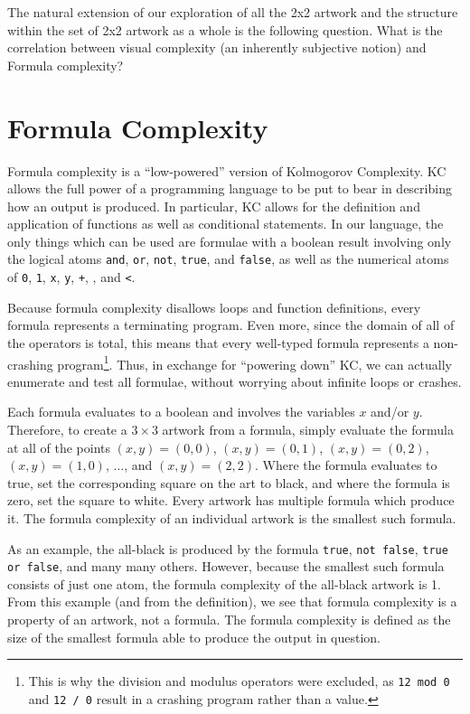 

The natural extension of our exploration of all the 2x2 artwork and the structure within the set of 2x2 artwork as a whole is the following question. What is the correlation between visual complexity (an inherently subjective notion) and
Formula complexity?  

\section{Formula Complexity}
Formula complexity is a ``low-powered'' version of Kolmogorov Complexity.  KC
allows the full power of a programming language to be put to bear in describing
how an output is produced.  In particular, KC allows for the definition and
application of functions as well as conditional statements.  In our language,
the only things which can be used are formulae with a boolean result
involving only the logical atoms {\tt and}, {\tt or}, {\tt not}, {\tt true},
and {\tt false}, as well as the numerical atoms of {\tt 0}, {\tt 1}, {\tt x},
{\tt y}, {\tt +}, {\tt *}, and {\tt <}.

Because formula complexity disallows loops and function definitions, every
formula represents a terminating program.  Even more, since the domain of all
of the operators is total, this means that every well-typed formula represents
a non-crashing program\footnote{This is why the division and modulus operators
were excluded, as {\tt 12 mod 0} and {\tt 12 / 0} result in a crashing program
rather than a value.}.  Thus, in exchange for ``powering down'' KC, we can
actually enumerate and test all formulae, without worrying about infinite loops
or crashes.

Each formula evaluates to a boolean and involves the variables $x$ and/or $y$.
Therefore, to create a $3\times3$ artwork from a formula, simply evaluate the formula
at all of the points $(x,y) = (0,0)$, $(x,y) = (0,1)$, $(x,y) = (0,2)$, $(x,y)
= (1,0)$, $\ldots$, and $(x,y) = (2,2)$.  Where the formula evaluates to true,
set the corresponding square on the art to black, and where the formula is
zero, set the square to white.  Every artwork has multiple formula which
produce it.  The formula complexity of an individual artwork is the smallest
such formula.

As an example, the all-black is produced by the formula {\tt true}, {\tt not
false}, {\tt true or false}, and many many others.  However, because the
smallest such formula consists of just one atom, the formula complexity of the
all-black artwork is 1.  From this example (and from the definition), we see
that formula complexity is a property of an artwork, not a formula.  The
formula complexity is defined as the size of the smallest formula able to
produce the output in question. 

